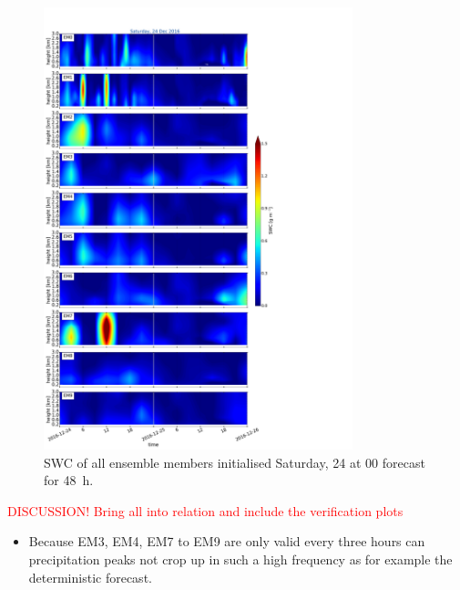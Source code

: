 \begin{figure}[t]
	\centering
	\includegraphics[trim={0cm 0cm 18.3cm 5.1cm},clip,width=0.8\textwidth]{./fig_09EM/20161224}
	\caption{SWC of all ensemble members initialised Saturday, \SI{24}{\dec} at 0\SI{0}{\UTC} forecast for \SI{48}{\hour}.}\label{fig:EM09_24}
\end{figure}
\textcolor{red}{DISCUSSION! Bring all into relation and include the verification plots}
\begin{itemize}
	\item Because EM3, EM4, EM7 to EM9 are only valid every three hours can precipitation peaks not crop up in such a high frequency as for example the deterministic forecast. 
\end{itemize}


